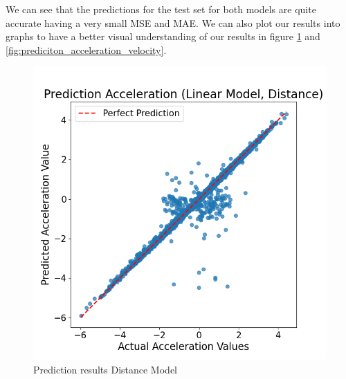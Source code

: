 We can see that the predictions for the test set for both models are quite accurate having a very small MSE and MAE. 
We can also plot our results into graphs to have a better visual understanding of our results 
in figure \ref{fig:prediciton_acceleration_distance} and \ref{fig:prediciton_acceleration_velocity}.

\begin{figure}[h]
    \centering
    \begin{minipage}[b]{0.45\columnwidth}
        \centering
        \includegraphics[width=\columnwidth]{images/figures/Prediction Acceleration (Linear Model, Distance).png}
        \caption{Prediction results Distance Model}
        \label{fig:prediciton_acceleration_distance}
    \end{minipage}
    \hfill
    \begin{minipage}[b]{0.45\columnwidth}
        \centering

\end{minipage}
\end{figure}
